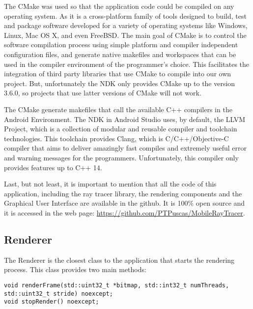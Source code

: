 \par
The CMake was used so that the application code could be compiled on any operating system.
As it is a cross-platform family of tools designed to build, test and package software developed for a variety of operating systems like Windows, Linux, Mac OS X, and even FreeBSD.
The main goal of CMake is to control the software compilation process using simple platform and compiler independent configuration files, and generate native makefiles and workspaces that can be used in the compiler environment of the programmer's choice.
This facilitates the integration of third party libraries that use CMake to compile into our own project.
But, unfortunately the NDK only provides CMake up to the version 3.6.0, so projects that use latter versions of CMake will not work.

\par
The CMake generate makefiles that call the available C++ compilers in the Android Environment.
The NDK in Android Studio uses, by default, the LLVM Project, which is a collection of modular and reusable compiler and toolchain technologies.
This toolchain provides Clang, which is C/C++/Objective-C compiler that aims to deliver amazingly fast compiles and extremely useful error and warning messages for the programmers.
Unfortunately, this compiler only provides features up to C++ 14.

\par
Last, but not least, it is important to mention that all the code of this application, including the ray tracer library, the rendering components and the Graphical User Interface are available in the github.
It is 100\% open source and it is accessed in the web page:
\url{https://github.com/PTPuscas/MobileRayTracer}.

\subsection{Renderer}

\par
The Renderer is the closest class to the application that starts the rendering process.
This class provides two main methods:

\begin{lstlisting}[caption={Main methods in Renderer}, captionpos=b, label=Renderer]
void renderFrame(std::uint32_t *bitmap, std::int32_t numThreads, std::uint32_t stride) noexcept;
void stopRender() noexcept;
\end{lstlisting}


